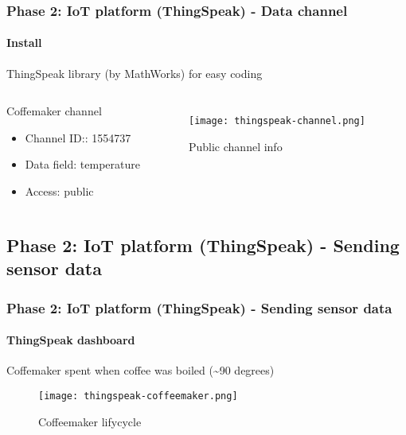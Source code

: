 \documentclass[
    aspectratio=169,                   %
]{beamer}
\begin{document}
    \begin{frame}
        \frametitle{Phase 2: IoT platform (ThingSpeak) - Data channel}

        \paragraph{Install} ThingSpeak library (by MathWorks) for easy coding

        \begin{columns}[T,onlytextwidth]
              \begin{block}{Coffemaker channel}
                \begin{itemize}
                    \item \alert{Channel ID:}: 1554737
                    \item \alert{Data field}: temperature
                    \item \alert{Access}: public\cite{thingspeakchannel}
                \end{itemize}
              \end{block}
            \begin{figure}
                \centering
                \begin{stampbox}
                    \texttt{[image: thingspeak-channel.png]}
                \end{stampbox}
                \caption{Public channel info}
            \end{figure}        
        \end{columns}

    \end{frame}

\subsection{Phase 2: IoT platform (ThingSpeak) - Sending sensor data}

    \begin{frame}
        \frametitle{Phase 2: IoT platform (ThingSpeak) - Sending sensor data}

        \paragraph{ThingSpeak dashboard} Coffemaker spent when coffee was boiled (\sim90 degrees)

        \begin{figure}
            \centering
            \begin{stampbox}
                \texttt{[image: thingspeak-coffeemaker.png]}
            \end{stampbox}
            \caption{Coffeemaker lifycycle}
        \end{figure}
        
    \end{frame}
\end{document}
